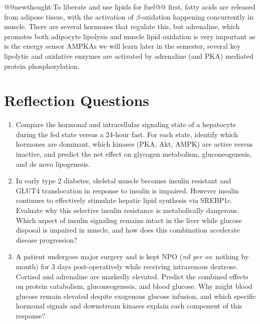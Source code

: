 \documentclass{tufte-handout}
\makeatletter
\def\newthought#1{@@newthought:#1@@}
\makeatother
\begin{document}
\newthought{To liberate and use lipids for fuel} first, fatty acids are released from adipose tissue, with the activation of $\beta$-oxidation happening concurrently in muscle.  There are several hormones that regulate this, but adrenaline, which promotes both adipocyte lipolysis and muscle lipid oxidation is very important as is the energy sensor AMPK\@  As we will learn later in the semester, several key lipolytic and oxidative enzymes are activated by adrenaline (and PKA) mediated protein phosphorylation.


\section{Reflection Questions}

\begin{enumerate}

\item Compare the hormonal and intracellular signaling state of a hepatocyte during the fed state versus a 24-hour fast.
  For each state, identify which hormones are dominant, which kinases (PKA, Akt, AMPK) are active versus inactive, and predict the net effect on glycogen metabolism, gluconeogenesis, and de novo lipogenesis.

\item In early type 2 diabetes, skeletal muscle becomes insulin resistant and GLUT4 translocation in response to insulin is impaired.  However insulin continues to effectively stimulate hepatic lipid synthesis via SREBP1c.
  Evaluate why this selective insulin resistance is metabolically dangerous.
  Which aspect of insulin signaling remains intact in the liver while glucose disposal is impaired in muscle, and how does this combination accelerate disease progression?

\item A patient undergoes major surgery and is kept NPO (\textit{nil per os}: nothing by mouth) for 3 days post-operatively while receiving intravenous dextrose.
  Cortisol and adrenaline are markedly elevated.
  Predict the combined effects on protein catabolism, gluconeogenesis, and blood glucose.
  Why might blood glucose remain elevated despite exogenous glucose infusion, and which specific hormonal signals and downstream kinases explain each component of this response?

\end{enumerate}



\end{document}

